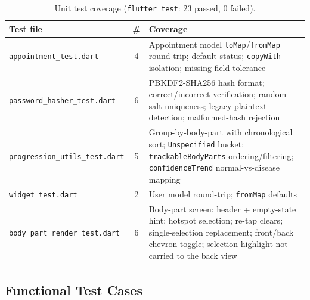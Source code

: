 \begin{table}[H]
\centering
\caption{Unit test coverage (\texttt{flutter test}: 23 passed, 0 failed).}
\label{tab:unit_tests}
\begin{tabular}{|p{3.7cm}|c|p{7.3cm}|}
\hline
\textbf{Test file} & \textbf{\#} & \textbf{Coverage} \\ \hline
\texttt{appointment\_test.dart} & 4 & Appointment model \texttt{toMap}/\texttt{fromMap} round-trip; default status; \texttt{copyWith} isolation; missing-field tolerance \\ \hline
\texttt{password\_hasher\_test.dart} & 6 & PBKDF2-SHA256 hash format; correct/incorrect verification; random-salt uniqueness; legacy-plaintext detection; malformed-hash rejection \\ \hline
\texttt{progression\_utils\_test.dart} & 5 & Group-by-body-part with chronological sort; \texttt{Unspecified} bucket; \texttt{trackableBodyParts} ordering/filtering; \texttt{confidenceTrend} normal-vs-disease mapping \\ \hline
\texttt{widget\_test.dart} & 2 & User model round-trip; \texttt{fromMap} defaults \\ \hline
\texttt{body\_part\_render\_test.dart} & 6 & Body-part screen: header + empty-state hint; hotspot selection; re-tap clears; single-selection replacement; front/back chevron toggle; selection highlight not carried to the back view \\ \hline
\end{tabular}
\end{table}

\subsection{Functional Test Cases}

